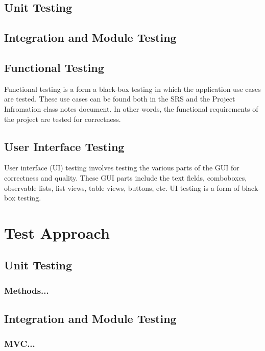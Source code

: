 \documentclass{scrreprt}
\begin{document}
    \section{Unit Testing}

    \section{Integration and Module Testing}

    \section{Functional Testing}
    Functional testing is a form a black-box testing in which the application use cases are tested. These use cases can be found both in the SRS and the Project Infromation class notes document. In other words, the functional requirements of the project are tested for correctness.

    \section{User Interface Testing}
    User interface (UI) testing involves testing the various parts of the GUI for correctness and quality. These GUI parts include the text fields, comboboxes, observable lists, list views, table views, buttons, etc. UI testing is a form of black-box testing.

    \chapter{Test Approach}

    \section{Unit Testing}

    \subsection{Methods...}

    \section{Integration and Module Testing}

    \subsection{MVC...}
\end{document}

